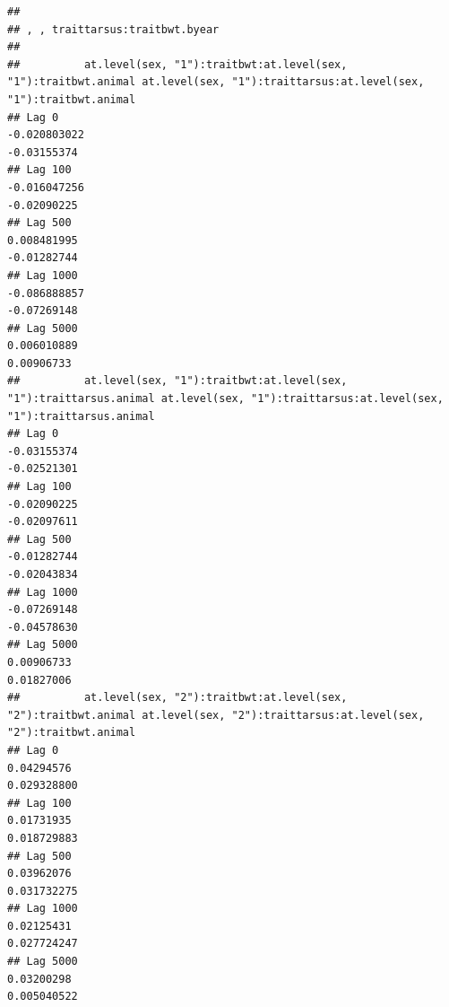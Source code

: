 \documentclass[
  12pt,
]{book}
\begin{document}
\begin{verbatim}
## 
## , , traittarsus:traitbwt.byear
## 
##          at.level(sex, "1"):traitbwt:at.level(sex, "1"):traitbwt.animal at.level(sex, "1"):traittarsus:at.level(sex, "1"):traitbwt.animal
## Lag 0                                                      -0.020803022                                                       -0.03155374
## Lag 100                                                    -0.016047256                                                       -0.02090225
## Lag 500                                                     0.008481995                                                       -0.01282744
## Lag 1000                                                   -0.086888857                                                       -0.07269148
## Lag 5000                                                    0.006010889                                                        0.00906733
##          at.level(sex, "1"):traitbwt:at.level(sex, "1"):traittarsus.animal at.level(sex, "1"):traittarsus:at.level(sex, "1"):traittarsus.animal
## Lag 0                                                          -0.03155374                                                          -0.02521301
## Lag 100                                                        -0.02090225                                                          -0.02097611
## Lag 500                                                        -0.01282744                                                          -0.02043834
## Lag 1000                                                       -0.07269148                                                          -0.04578630
## Lag 5000                                                        0.00906733                                                           0.01827006
##          at.level(sex, "2"):traitbwt:at.level(sex, "2"):traitbwt.animal at.level(sex, "2"):traittarsus:at.level(sex, "2"):traitbwt.animal
## Lag 0                                                        0.04294576                                                       0.029328800
## Lag 100                                                      0.01731935                                                       0.018729883
## Lag 500                                                      0.03962076                                                       0.031732275
## Lag 1000                                                     0.02125431                                                       0.027724247
## Lag 5000                                                     0.03200298                                                       0.005040522

\end{verbatim}
\end{document}
